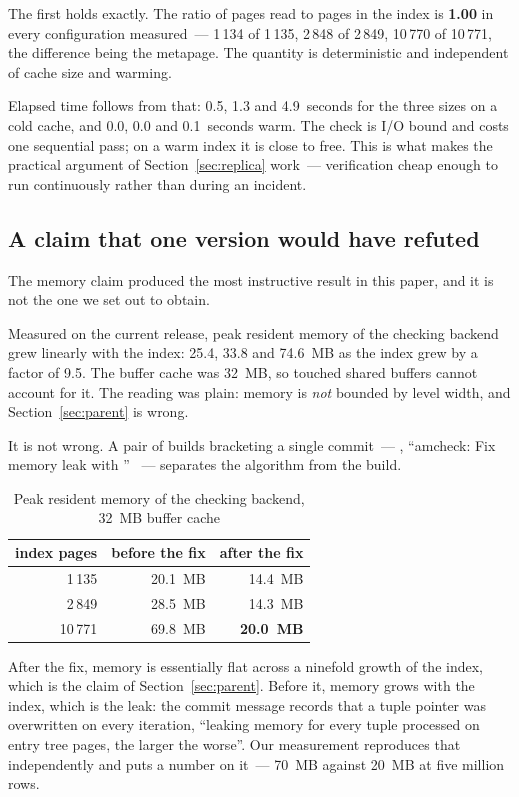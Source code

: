 The first holds exactly. The ratio of pages read to pages in the index is
\textbf{1.00} in every configuration measured~--- 1\,134 of 1\,135, 2\,848 of
2\,849, 10\,770 of 10\,771, the difference being the metapage. The quantity is
deterministic and independent of cache size and warming.

Elapsed time follows from that: 0.5, 1.3 and 4.9~seconds for the three sizes on a
cold cache, and 0.0, 0.0 and 0.1~seconds warm. The check is I/O bound and costs
one sequential pass; on a warm index it is close to free. This is what makes the
practical argument of Section~\ref{sec:replica} work~--- verification cheap
enough to run continuously rather than during an incident.

\subsection{A claim that one version would have refuted}

The memory claim produced the most instructive result in this paper, and it is
not the one we set out to obtain.

Measured on the current release, peak resident memory of the checking backend
grew linearly with the index: 25.4, 33.8 and 74.6~MB as the index grew by a
factor of 9.5. The buffer cache was 32~MB, so touched shared buffers cannot
account for it. The reading was plain: memory is \emph{not} bounded by level
width, and Section~\ref{sec:parent} is wrong.

It is not wrong. A pair of builds bracketing a single commit~---
, ``amcheck: Fix memory leak with ''
\cite{thread-gin-amcheck-leak}~--- separates the algorithm from the build.

\begin{table}[t]
\centering
\caption{Peak resident memory of the checking backend, 32~MB buffer cache}
\label{tab:memory}
\begin{tabular}{rrr}
\toprule
index pages & before the fix & after the fix \\
\midrule
1\,135 & 20.1~MB & 14.4~MB \\
2\,849 & 28.5~MB & 14.3~MB \\
10\,771 & 69.8~MB & \textbf{20.0~MB} \\
\bottomrule
\end{tabular}
\end{table}

After the fix, memory is essentially flat across a ninefold growth of the index,
which is the claim of Section~\ref{sec:parent}. Before it, memory grows with the
index, which is the leak: the commit message records that a tuple pointer was
overwritten on every iteration, ``leaking memory for every tuple processed on
entry tree pages, the larger the worse''. Our measurement reproduces that
independently and puts a number on it~--- 70~MB against 20~MB at five million
rows.


